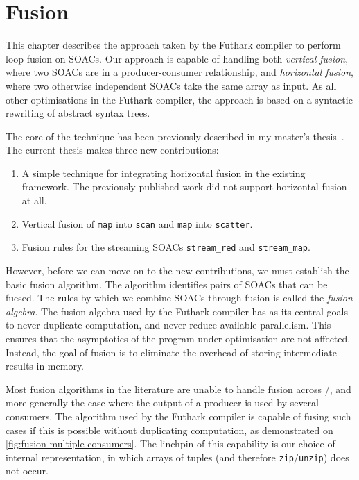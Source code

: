 \chapter{Fusion}
\label{chap:fusion}

This chapter describes the approach taken by the Futhark compiler to
perform loop fusion on SOACs.  Our approach is capable of handling
both \textit{vertical fusion}, where two SOACs are in a
producer-consumer relationship, and \textit{horizontal fusion}, where
two otherwise independent SOACs take the same array as input.  As all
other optimisations in the Futhark compiler, the approach is based on
a syntactic rewriting of abstract syntax trees.

The core of the technique has been previously described in my master's
thesis~\cite{henriksen2014exploiting}.  The current thesis makes three
new contributions:

\begin{enumerate}
\item A simple technique for integrating horizontal fusion in the
  existing framework.  The previously published work did not support
  horizontal fusion at all.
\item Vertical fusion of \lstinline{map} into \lstinline{scan} and
  \lstinline{map} into \lstinline{scatter}.
\item Fusion rules for the streaming SOACs \lstinline{stream_red} and
  \lstinline{stream_map}.
\end{enumerate}

However, before we can move on to the new contributions, we must
establish the basic fusion algorithm.  The algorithm identifies pairs
of SOACs that can be fuesed.  The rules by which we combine SOACs
through fusion is called the \textit{fusion algebra}.  The fusion
algebra used by the Futhark compiler has as its central goals to never
duplicate computation, and never reduce available parallelism.  This
ensures that the asymptotics of the program under optimisation are not
affected.  Instead, the goal of fusion is to eliminate the overhead of
storing intermediate results in memory.

Most fusion algorithms in the literature are unable to handle fusion
across /, and more generally the case where the
output of a producer is used by several consumers.  The algorithm used
by the Futhark compiler is capable of fusing such cases if this is
possible without duplicating computation, as demonstrated on
\cref{fig:fusion-multiple-consumers}.  The linchpin of this capability
is our choice of internal representation, in which arrays of tuples
(and therefore \lstinline{zip}/\lstinline{unzip}) does not occur.

